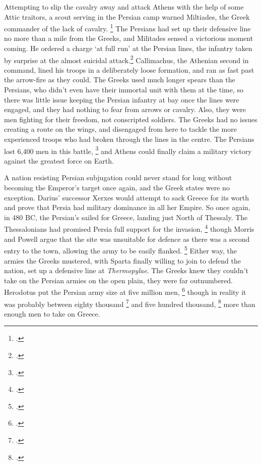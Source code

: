 \documentclass[twoside, a4paper, 12pt]{article}
\begin{document}
Attempting to slip the cavalry away and attack Athens with the help of some
Attic traitors, a scout serving in the Persian camp warned Miltiades, the Greek
commander of the lack of cavalry.
\footcite[35]{green_darius_west}
The Persians had set up their defensive line
no more than a mile from the Greeks, and Militades sensed a victorious moment
coming. He ordered a charge `at full run' at the Persian lines, the infantry
taken by surprise at the almost suicidal attack.\footcite[Book 6.112]{herodotus_1920}
Callimachus, the Athenian second in command, lined his troops in a
deliberately loose formation, and ran as fast past the arrow-fire as they could.
The Greeks used much longer spears than the Persians, who didn't even have their
immortal unit with them at the time, so there was little issue keeping the
Persian infantry at bay once the lines were engaged, and they had nothing to
fear from arrows or cavalry. Also, they were men fighting for their freedom,
not conscripted soldiers. The Greeks had no issues creating a route on the wings,
and disengaged from here to tackle the more experienced troops who had broken
through the lines in the centre. The Persians lost 6,400 men in this battle,
\footcite[37]{green_darius_west} and
Athens could finally claim a military victory against the greatest force on Earth.


\par\vspace{1em}

A nation resisting Persian subjugation could never stand for long without
becoming the Emperor's target once again, and the Greek states were no
exception. Darius' successor Xerxes would attempt to sack Greece for its worth
and prove that Persia had military dominance in all her Empire. So once again, in 480 BC,
the Persian's sailed for Greece, landing just North of Thessaly. The Thessalonians
had promised Persia full support for the invasion, \footcite[52]{green_legacy_marathon}
though Morris and Powell argue that the site was unsuitable for defence
as there was a second entry to the town, allowing the army to be easily
flanked. \footcite[260]{morris_powell_2010} Either way, the armies the Greeks
mustered, with Sparta finally willing to join to defend the nation, set up
a defensive line at \emph{Thermopylae}. The Greeks knew they
couldn't take on the Persian armies on the open plain, they were far outnumbered.
Herodotus put the Persian army size at five million men,
\footcite[Book 7.185-6]{herodotus_1920}
though in reality it was probably between eighty thousand \footcite{kim_grecopersia_2017}
and five hundred thousand, \footcite[285]{morris_powell_2010} more than
enough men to take on Greece.
\end{document}
